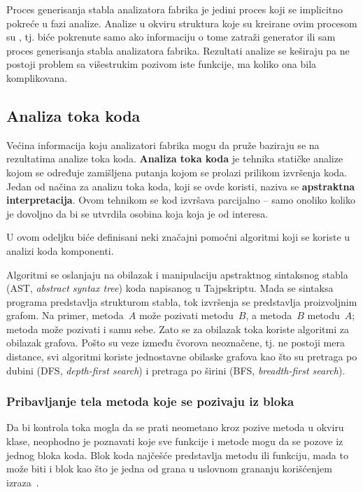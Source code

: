 Proces generisanja stabla analizatora fabrika je jedini proces koji se implicitno pokreće u fazi analize.
Analize u okviru struktura koje su kreirane ovim procesom su , tj. biće pokrenute samo ako informaciju o tome zatraži generator ili sam proces generisanja stabla analizatora fabrika.
Rezultati analize se keširaju pa ne postoji problem sa višestrukim pozivom iste funkcije, ma koliko ona bila komplikovana.

\subsection{Analiza toka koda}

Većina informacija koju analizatori fabrika mogu da pruže baziraju se na rezultatima analize toka koda.
\textbf{Analiza toka koda} je tehnika statičke analize kojom se određuje zamišljena putanja kojom se prolazi prilikom izvršenja koda.
Jedan od načina za analizu toka koda, koji se ovde koristi, naziva se \textbf{apstraktna interpretacija}.
Ovom tehnikom se kod izvršava parcijalno -- samo onoliko koliko je dovoljno da bi se utvrdila osobina koja koja je od interesa.

U ovom odeljku biće definisani neki značajni pomoćni algoritmi koji se koriste u analizi koda komponenti.

Algoritmi se oslanjaju na obilazak i manipulaciju apstraktnog sintaksnog stabla (AST, \textsl{abstract syntax tree}) koda napisanog u Tajpskriptu.
Mada se sintaksa programa predstavlja strukturom stabla, tok izvršenja se predstavlja proizvoljnim grafom.
Na primer, metoda~$A$ može pozivati metodu~$B$, a metoda~$B$ metodu~$A$; metoda može pozivati i samu sebe.
Zato se za obilazak toka koriste algoritmi za obilazak grafova.
Pošto su veze između čvorova neoznačene, tj. ne postoji mera distance, svi algoritmi koriste jednostavne obilaske grafova kao što su pretraga po dubini (DFS, \textsl{depth-first search}) i pretraga po širini (BFS, \textsl{breadth-first search}).

\subsubsection{Pribavljanje tela metoda koje se pozivaju iz bloka}\label{sec:algo:get-bodies-called-from}

Da bi kontrola toka mogla da se prati neometano kroz pozive metoda u okviru klase, neophodno je poznavati koje sve funkcije i metode mogu da se pozove iz jednog bloka koda.
Blok koda najčešće predstavlja metodu ili funkciju, mada to može biti i blok kao što je jedna od grana u uslovnom grananju korišćenjem izraza~.

